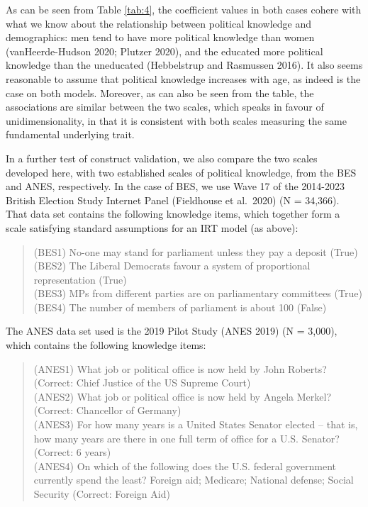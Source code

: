 \documentclass[12pt,halfline,a4paper,]{ouparticle}
\begin{document}
As can be seen from Table \ref{tab:4}, the coefficient values in both
cases cohere with what we know about the relationship between political
knowledge and demographics: men tend to have more political knowledge
than women (vanHeerde-Hudson 2020; Plutzer 2020), and the educated more
political knowledge than the uneducated (Hebbelstrup and Rasmussen
2016). It also seems reasonable to assume that political knowledge
increases with age, as indeed is the case on both models. Moreover, as
can also be seen from the table, the associations are similar between
the two scales, which speaks in favour of unidimensionality, in that it
is consistent with both scales measuring the same fundamental underlying
trait.

In a further test of construct validation, we also compare the two
scales developed here, with two established scales of political
knowledge, from the BES and ANES, respectively. In the case of BES, we
use Wave 17 of the 2014-2023 British Election Study Internet Panel
(Fieldhouse et al.~2020) (N = 34,366). That data set contains the
following knowledge items, which together form a scale satisfying
standard assumptions for an IRT model (as above):

\begin{quote}
(BES1) No-one may stand for parliament unless they pay a deposit
(True)\\
(BES2) The Liberal Democrats favour a system of proportional
representation (True)\\
(BES3) MPs from different parties are on parliamentary committees
(True)\\
(BES4) The number of members of parliament is about 100 (False)
\end{quote}

The ANES data set used is the 2019 Pilot Study (ANES 2019) (N = 3,000),
which contains the following knowledge items:

\begin{quote}
(ANES1) What job or political office is now held by John Roberts?
(Correct: Chief Justice of the US Supreme Court)\\
(ANES2) What job or political office is now held by Angela Merkel?
(Correct: Chancellor of Germany)\\
(ANES3) For how many years is a United States Senator elected -- that
is, how many years are there in one full term of office for a U.S.
Senator? (Correct: 6 years)\\
(ANES4) On which of the following does the U.S. federal government
currently spend the least? Foreign aid; Medicare; National defense;
Social Security (Correct: Foreign Aid)
\end{quote}
\end{document}
